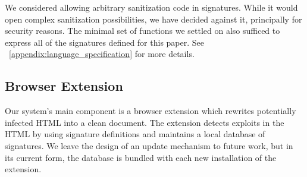 We considered allowing arbitrary sanitization code in
signatures. While it would open complex sanitization possibilities, we
have decided against it, principally for security reasons. The minimal
set of functions we settled on also sufficed to express all of the
signatures defined for this paper. See ~\autoref{appendix:language_specification} for
more details.


 \subsection{Browser Extension} \label{firefox_extension}

 Our system's main component is a browser extension which rewrites
 potentially infected HTML into a clean document.
 The extension detects exploits in the HTML by using signature definitions and
 maintains a local database of signatures. We leave the design of an
 update mechanism to future work, but in its current form, the
 database is bundled with each new installation of the extension.

